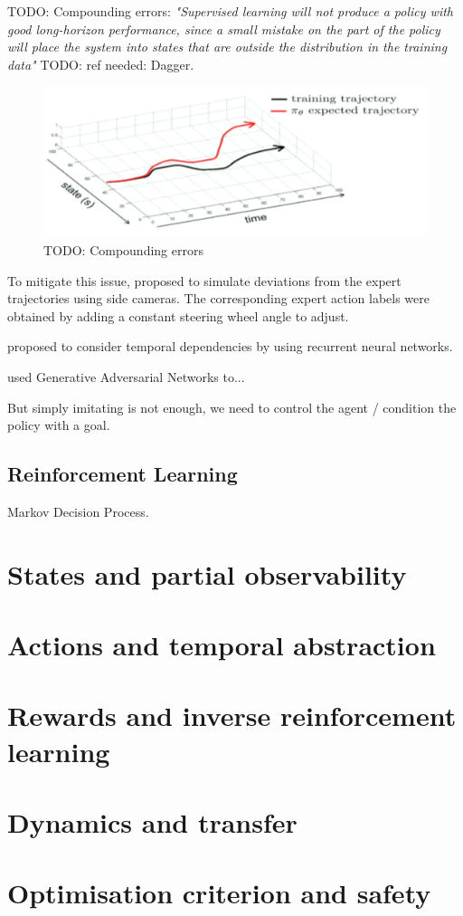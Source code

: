 TODO: Compounding errors: \emph{"Supervised learning will not produce a policy with good long-horizon
performance, since a small mistake on the part of the policy will place the system
into states that are outside the distribution in the training data"} \citep{Levine2016}
TODO: ref needed: Dagger.

\begin{figure}[tp]
	\centering
	\includegraphics[width=0.7\linewidth]{img/cp4}
	\caption{TODO: Compounding errors}
\end{figure}

To mitigate this issue, \citep{Bojarski2016} proposed to simulate deviations from the expert trajectories using side cameras. The corresponding expert action labels were obtained by adding a constant steering wheel angle to adjust.

\citep{Eraqi2017,Xu2017} proposed to consider temporal dependencies by using recurrent neural networks.

\citep{Kuefler2017,Bhattacharyya2018} used Generative Adversarial Networks to...

But simply imitating is not enough, we need to control the agent / condition the policy with a goal. \citep{Codevilla2018}

\subsection{Reinforcement Learning}

Markov Decision Process.
\section{States and partial observability}
\section{Actions and temporal abstraction}
\section{Rewards and inverse reinforcement learning}
\section{Dynamics and transfer}
\section{Optimisation criterion and safety}
